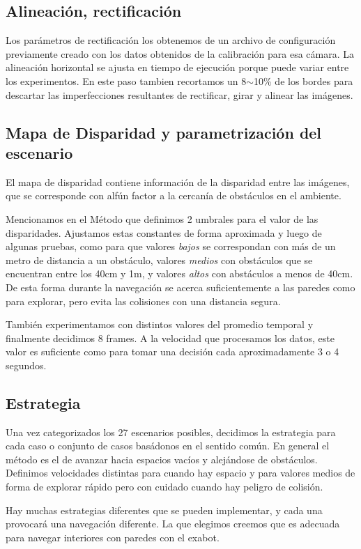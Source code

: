 \documentclass[journal,a4paper]{IEEEtran}
\begin{document}
\subsection{Alineación, rectificación}
Los parámetros de rectificación los obtenemos de un archivo de configuración previamente creado con los datos obtenidos de la calibración para esa cámara.
La alineación horizontal se ajusta en tiempo de ejecución porque puede variar entre los experimentos.
En este paso tambien recortamos un 8$\sim$10\% de los bordes para descartar las imperfecciones resultantes de rectificar, girar y alinear las imágenes.

\subsection{Mapa de Disparidad y parametrización del escenario}
El mapa de disparidad contiene información de la disparidad entre las imágenes, que se corresponde con alfún factor a la cercanía de obstáculos en el ambiente.

Mencionamos en el Método que definimos 2 umbrales para el valor de las disparidades.
Ajustamos estas constantes de forma aproximada y luego de algunas pruebas, como para que valores \emph{bajos} se correspondan con más de un metro de distancia a un obstáculo, valores \emph{medios} con obstáculos que se encuentran entre los 40cm y 1m, y valores \emph{altos} con abstáculos a menos de 40cm.
De esta forma durante la navegación se acerca suficientemente a las paredes como para explorar, pero evita las colisiones con una distancia segura.

También experimentamos con distintos valores del promedio temporal y finalmente decidimos 8 frames. A la velocidad que procesamos los datos, este valor es suficiente como para tomar una decisión cada aproximadamente 3 o 4 segundos.

\subsection{Estrategia}
Una vez categorizados los 27 escenarios posibles, decidimos la estrategia para cada caso o conjunto de casos basádonos en el sentido común.
En general el método es el de avanzar hacia espacios vacíos y alejándose de obstáculos. Definimos velocidades distintas para cuando hay espacio y para valores medios de forma de explorar rápido pero con cuidado cuando hay peligro de colisión.

Hay muchas estrategias diferentes que se pueden implementar, y cada una provocará una navegación diferente. La que elegimos creemos que es adecuada para navegar interiores con paredes con el exabot.
\end{document}
